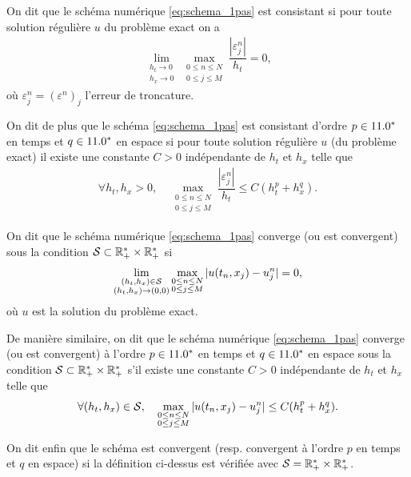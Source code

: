 \documentclass[12pt,a4paper,twoside]{article}
\begin{document}
\begin{definition}[Consistance]
  \label{def:consistance}
  On dit que le sch\'ema num\'erique \eqref{eq:schema_1pas} est consistant si pour toute
  solution r\'eguli\`ere $u$ du probl\`eme exact on a
  \begin{align}
    \lim_{\substack{h_t \to 0\\ h_x \to 0}} \max_{\substack{0\leq n \leq N\\ 0 \leq j \leq M}} 
    \dfrac{| \varepsilon_j^n|}{h_t} = 0 ,
  \end{align}
  o\`u $\varepsilon_j^n = (\varepsilon^n)_j$ l'erreur de troncature.

  On dit de plus que le sch\'ema \eqref{eq:schema_1pas} est consistant d'ordre $p \in 11.0^*$
  en temps et $q \in 11.0^*$ en espace si pour toute solution r\'eguli\`ere $u$ (du probl\`eme exact)
  il existe une constante $C>0$ ind\'ependante de $h_t$ et $h_x$ telle que
  \begin{align}
    \forall h_t , h_x > 0 , \quad \max_{\substack{0\leq n \leq N\\ 0 \leq j \leq M}}
    \dfrac{| \varepsilon_j^n|}{h_t} \leq C (h_t^p + h_x^q) .
  \end{align}
\end{definition}

\begin{definition}[Convergence]
  \label{def:convergence}
  On dit que le sch\'ema num\'erique \eqref{eq:schema_1pas} converge (ou est convergent) 
  sous la condition $\mathcal{S} \subset \mathbb{R}_+^* \times \mathbb{R}_+^*$
  si 
  \begin{align}
    \lim_{\substack{(h_t,h_x) \in \mathcal{S} \\ (h_t,h_x) \to (0,0)}} \max_{\substack{0\leq n \leq N\\ 0 \leq j \leq M}} 
    | u(t_n , x_j) - u_j^n | = 0 ,
  \end{align}
  o\`u $u$ est la solution du probl\`eme exact.
  
  De mani\`ere similaire, on dit que le sch\'ema num\'erique 
  \eqref{eq:schema_1pas} converge (ou est convergent) 
  \`a l'ordre $p\in11.0^*$ en temps et $q\in11.0^*$ en espace
  sous la condition $\mathcal{S} \subset \mathbb{R}_+^* \times \mathbb{R}_+^*$
  s'il existe une constante $C>0$ ind\'ependante de $h_t$ et $h_x$
  telle que
  \begin{align}
    \forall (h_t , h_x) \in \mathcal{S} , \quad \max_{\substack{0\leq n \leq N\\ 0 \leq j \leq M}}
    | u(t_n,x_j) - u_j^n | \leq C (h_t^p + h_x^q) .
  \end{align}

  On dit enfin que le sch\'ema est convergent (resp. convergent \`a l'ordre $p$
  en temps et $q$ en espace) si la d\'efinition ci-dessus est v\'erifi\'ee
  avec $\mathcal{S} = \mathbb{R}_+^* \times \mathbb{R}_+^*$.
\end{definition}
\end{document}
